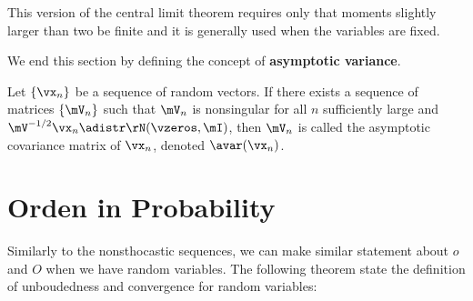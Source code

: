 \documentclass[english,12pt]{book}\usepackage[]{graphicx}\usepackage[]{xcolor}
\begin{document}
This version of the central limit theorem requires only that moments slightly larger than two be finite and it is generally used when the variables are fixed. 

We end this section by defining the concept of \textbf{asymptotic variance}.


\begin{definition}\label{def:asymptotic_variance}
Let $\left\lbrace\vx_n\right\rbrace$ be a sequence of random vectors. If there exists a sequence of matrices $\left\lbrace \mV_n\right\rbrace$ such that $\mV_n$ is nonsingular for all $n$ sufficiently large and $\mV^
{-1/2}\vx_n \adistr \rN(\vzeros, \mI)$, then $\mV_n$ is called the asymptotic covariance matrix of $\vx_n$, denoted $\avar(\vx_n)$.
\end{definition}


\section{Orden in Probability}


Similarly to the nonsthocastic sequences, we can make similar statement about $o$ and $O$ when we have random variables. The following theorem state the definition of unboudedness and convergence for random variables: 
\end{document}
